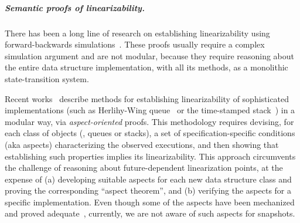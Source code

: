 
\subparagraph*{Semantic proofs of linearizability.}
\label{sec:semant-proofs-line}

There has been a long line of research on establishing linearizability
using forward-backwards
simulations~\cite{SchellhornWD+CAV12,ColvinGLM06,ColvinDG05}. These
proofs usually require a complex simulation argument and are not
modular, because they require reasoning about the entire data structure
implementation, with all its methods, as a monolithic
state-transition system.

Recent works~\cite{HenzingerSV+CONCUR13, ChakrabortyHSV+LMCS15,
  DoddsHK+POPL15} describe methods for establishing linearizability of
sophisticated implementations (such as Herlihy-Wing
queue~\cite{HerlihyW+TOPLAS90} or the time-stamped
stack~\cite{DoddsHK+POPL15}) in a modular way, via
\emph{aspect-oriented} proofs.
%
This methodology requires devising, for each class of objects (\eg,
queues or stacks), a set of specification-specific conditions (aka
aspects) characterizing the observed executions, and then showing that
establishing such properties implies its linearizability.
%
This approach circumvents the challenge of reasoning about
future-dependent linearization points, at the expense of (a)
developing suitable aspects for each new data structure class and
proving the corresponding ``aspect theorem'', and (b) verifying the
aspects for a specific implementation. 
%
%
Even though some of the aspects have been mechanized and proved
adequate~\cite{DoddsHK+POPL15}, 
%
currently, we are not aware of such aspects for snapshots.


%

